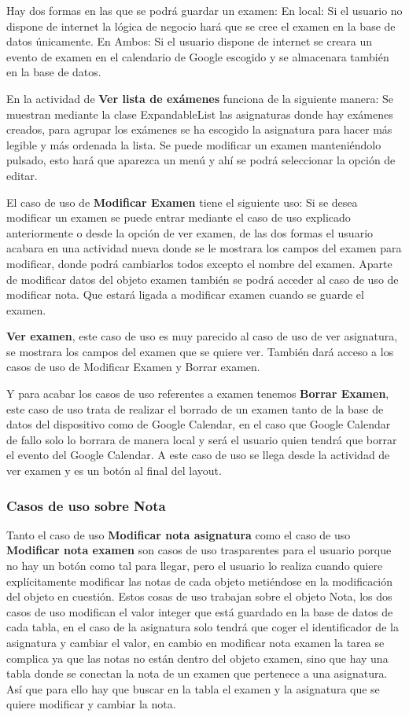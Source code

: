 Hay dos formas en las que se podrá guardar un examen:
En local: Si el usuario no dispone de internet la lógica de negocio hará que se cree el examen en la base de datos únicamente.
En Ambos: Si el usuario dispone de internet se creara un evento de examen en el calendario de Google escogido  y se almacenara también en la base de datos.

En la actividad de \textbf{Ver lista de exámenes} funciona de la siguiente manera:
Se muestran mediante la clase ExpandableList las asignaturas donde hay exámenes creados, para agrupar los exámenes se ha escogido la asignatura para hacer más legible y más ordenada la lista.
Se puede modificar un examen manteniéndolo pulsado, esto hará que aparezca un menú y ahí se podrá seleccionar la opción de editar.

El caso de uso de \textbf{Modificar Examen} tiene el siguiente uso:
Si se desea modificar un examen se puede entrar mediante el caso de uso explicado anteriormente o desde la opción de ver examen, de las dos formas el usuario acabara en una actividad nueva donde se le mostrara los campos del examen para modificar, donde podrá cambiarlos todos excepto el nombre del examen.
Aparte de modificar datos del objeto examen también se podrá acceder al caso de uso de modificar nota. Que estará ligada a modificar examen cuando se guarde el examen.

\textbf{Ver examen}, este caso de uso es muy parecido al caso de uso de ver asignatura, se mostrara los campos del examen que se quiere ver.
También dará acceso a los casos de uso de Modificar Examen y Borrar examen.

Y para acabar los casos de uso referentes a examen tenemos \textbf{Borrar Examen}, este caso de uso trata de realizar el borrado de un examen tanto de la base de datos del dispositivo como de Google Calendar, en el caso que Google Calendar de fallo solo lo borrara de manera local y será el usuario quien tendrá que borrar el evento del Google Calendar.
A este caso de uso se llega desde la actividad de ver examen y es un botón al final del layout.

\subsubsection{Casos de uso sobre Nota}
\label{subsubsecc:Casos de uso sobre Nota}

Tanto el caso de uso \textbf{Modificar nota asignatura} como el caso de uso \textbf{Modificar nota examen} son casos de uso trasparentes para el usuario porque no hay un botón como tal para llegar, pero el usuario lo realiza cuando quiere explícitamente modificar las notas de cada objeto metiéndose en la modificación del objeto en cuestión.
Estos cosas de uso trabajan sobre el objeto Nota, los dos casos de uso modifican el valor integer que está guardado en la base de datos de cada tabla, en el caso de la asignatura solo tendrá que coger el identificador de la asignatura y cambiar el valor, en cambio en modificar nota examen la tarea se complica ya que las notas no están dentro del objeto examen, sino que hay una tabla donde se conectan la nota de un examen que pertenece a una asignatura. Así que para ello hay que buscar en la tabla el examen y la asignatura que se quiere modificar y cambiar la nota.

